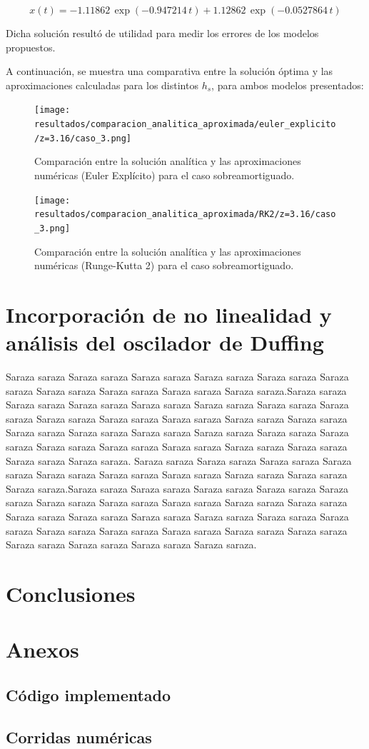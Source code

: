 \documentclass[titlepage,a4paper]{article}
\begin{document}
\[
x(t) = -1.11862\,\exp\left(-0.947214\,t\right) + 1.12862\,\exp\left(-0.0527864\,t\right)
\]

Dicha solución resultó de utilidad para medir los errores de los modelos propuestos.

A continuación, se muestra una comparativa entre la solución óptima y las aproximaciones calculadas para los distintos $h_s$, para ambos modelos presentados:

\begin{figure}[H]
  \centering
  \texttt{[image: resultados/comparacion\_analitica\_aproximada/euler\_explicito/z=3.16/caso\_3.png]}
  \caption{Comparación entre la solución analítica y las aproximaciones numéricas (Euler Explícito) para el caso sobreamortiguado.}
\end{figure}

\begin{figure}[H]
  \centering
  \texttt{[image: resultados/comparacion\_analitica\_aproximada/RK2/z=3.16/caso\_3.png]}
  \caption{Comparación entre la solución analítica y las aproximaciones numéricas (Runge-Kutta 2) para el caso sobreamortiguado.}
\end{figure}


\section{Incorporación de no linealidad y análisis del oscilador de Duffing}

Saraza saraza Saraza saraza Saraza saraza Saraza saraza Saraza saraza Saraza saraza Saraza saraza Saraza saraza Saraza saraza Saraza saraza.Saraza saraza Saraza saraza Saraza saraza Saraza saraza Saraza saraza Saraza saraza Saraza saraza Saraza saraza Saraza saraza Saraza saraza Saraza saraza Saraza saraza Saraza saraza Saraza saraza Saraza saraza Saraza saraza Saraza saraza Saraza saraza Saraza saraza Saraza saraza Saraza saraza Saraza saraza Saraza saraza Saraza saraza Saraza saraza. Saraza saraza Saraza saraza Saraza saraza Saraza saraza Saraza saraza Saraza saraza Saraza saraza Saraza saraza Saraza saraza Saraza saraza.Saraza saraza Saraza saraza Saraza saraza Saraza saraza Saraza saraza Saraza saraza Saraza saraza Saraza saraza Saraza saraza Saraza saraza Saraza saraza Saraza saraza Saraza saraza Saraza saraza Saraza saraza Saraza saraza Saraza saraza Saraza saraza Saraza saraza Saraza saraza Saraza saraza Saraza saraza Saraza saraza Saraza saraza Saraza saraza.


\section{Conclusiones}


\section{Anexos}
\subsection{Código implementado}

\subsection{Corridas numéricas}
\end{document}

